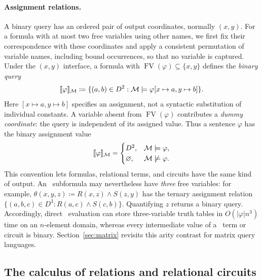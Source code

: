 \paragraph{Assignment relations.}
A binary query has an ordered pair of output coordinates, normally
$(x,y)$. For a formula with at most two free variables using other
names, we first fix their correspondence with these coordinates and
apply a consistent permutation of variable names, including bound
occurrences, so that no variable is captured. Under the $(x,y)$ interface, a formula with
$\operatorname{FV}(\varphi)\subseteq\{x,y\}$ defines the
\emph{binary query}
\[
 \llbracket \varphi\rrbracket_{\mathcal M}
 \coloneqq\{(a,b)\in D^2:\mathcal M\models
       \varphi[x\mapsto a,y\mapsto b]\}.
\]
Here $[x\mapsto a,y\mapsto b]$ specifies an assignment, not a
syntactic substitution of individual constants.
A variable absent from $\operatorname{FV}(\varphi)$ contributes a
\emph{dummy coordinate}: the query is independent of its assigned value.
Thus a sentence $\varphi$ has the binary assignment value
\[
 \llbracket \varphi\rrbracket_{\mathcal M}
 =\begin{cases}
     D^2,&\mathcal M\models\varphi,\\
     \varnothing,&\mathcal M\not\models\varphi.
   \end{cases}
\]
This convention lets formulas, relational terms, and circuits have the
same kind of output. An \FOthree\ subformula may nevertheless have
\emph{three} free variables: for example,
$\theta(x,y,z)\coloneqq R(x,z)\land S(z,y)$ has the ternary assignment
relation $\{(a,b,c)\in D^3:R(a,c)\land S(c,b)\}$. Quantifying $z$
returns a binary query. Accordingly, direct \FOthree\ evaluation can
store three-variable truth tables in $O(|\varphi|n^3)$ time on an
$n$-element domain, whereas every intermediate value of a \CoR\ term
or circuit is binary. Section~\ref{sec:matrix} revisits this arity
contrast for matrix query languages.

\subsection{The calculus of relations and relational circuits}\label{sec:prelim-cor}
